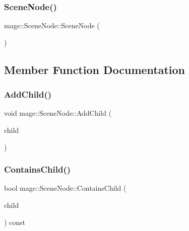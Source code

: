 \hypertarget{classmage_1_1_scene_node_a7c3db24cf811eba9a12b5a2989e7f27f}{}\label{classmage_1_1_scene_node_a7c3db24cf811eba9a12b5a2989e7f27f} 
\subsubsection{\texorpdfstring{Scene\+Node()}{SceneNode()}}
{\footnotesize\ttfamily mage\+::\+Scene\+Node\+::\+Scene\+Node (\begin{DoxyParamCaption}{ }\end{DoxyParamCaption})\hspace{0.3cm}{\ttfamily [protected]}}



\subsection{Member Function Documentation}
\hypertarget{classmage_1_1_scene_node_ac07f89af783b1658a1f74205914f6fa3}{}\label{classmage_1_1_scene_node_ac07f89af783b1658a1f74205914f6fa3} 
\subsubsection{\texorpdfstring{Add\+Child()}{AddChild()}}
{\footnotesize\ttfamily void mage\+::\+Scene\+Node\+::\+Add\+Child (\begin{DoxyParamCaption}\item[{\hyperlink{classmage_1_1_scene_node}{Scene\+Node} $\ast$}]{child }\end{DoxyParamCaption})}

\hypertarget{classmage_1_1_scene_node_ae810fa86b94a35e230faff5305946ba1}{}\label{classmage_1_1_scene_node_ae810fa86b94a35e230faff5305946ba1} 
\subsubsection{\texorpdfstring{Contains\+Child()}{ContainsChild()}}
{\footnotesize\ttfamily bool mage\+::\+Scene\+Node\+::\+Contains\+Child (\begin{DoxyParamCaption}\item[{\hyperlink{classmage_1_1_scene_node}{Scene\+Node} $\ast$}]{child }\end{DoxyParamCaption}) const}

